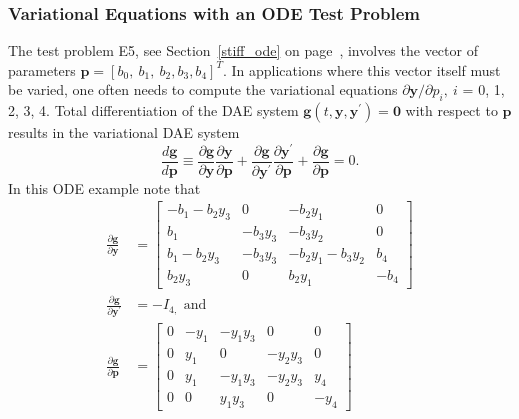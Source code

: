 \documentclass[twoside]{MATH77}
\begin{document}
\subsubsection{Variational Equations with an ODE Test Problem}
The test problem E5, see Section~\ref{stiff_ode} on page~\pageref{stiff_ode},
involves the vector of parameters $\mathbf{p}=[b_{0},\ b_{1},\ b_{2}, b_{3},
b_{4}]^T$.  In applications where this vector itself must be varied, one often
needs to compute the variational equations $\partial \mathbf{y}/\partial
p_{i},\ i$ = 0, 1, 2, 3, 4. Total differentiation of the DAE system
$\mathbf{g}(t,\mathbf{y}, \mathbf{y}^{\prime}) =\mathbf{0}$ with respect to
$\mathbf{p}$ results in the variational DAE system
\begin{equation*}
  \frac{d \mathbf{g}}{d\mathbf{p}}\equiv\frac{\partial \mathbf{g}}{\partial
    \mathbf{y}}\frac{\partial \mathbf{y}}{\partial \mathbf{p}}
  +\frac{\partial \mathbf{g}}{\partial
    \mathbf{y}^{\prime}}\frac{\partial \mathbf{y}^{\prime}}{\partial \mathbf{p}}
  +\frac{\partial \mathbf{g}}{\partial \mathbf{p}}=0.
\end{equation*}
In this ODE example note that
\begin{align*}
  \frac{\partial \mathbf{g}}{\partial \mathbf{y}}&=
  \begin{bmatrix}
    -b_{1}-b_{2}y_{3} & 0 & -b_{2}y_{1} & 0\\
    b_{1} & -b_{3}y_{3} & -b_{3}y_{2} & 0\\
    b_{1}-b_{2}y_{3} & -b_{3}y_{3} & -b_{2}y_{1}-b_{3}y_{2} & b_{4}\\
    b_{2}y_{3} & 0 & b_{2}y_{1} & -b_{4}
  \end{bmatrix}\\
  \frac{\partial \mathbf{g}}{\partial \mathbf{y}^{\prime}}&=-I_{4,}\text{ and}\\
  \frac{\partial \mathbf{g}}{\partial \mathbf{p}}&=
  \begin{bmatrix}
    0 & -y_{1} & -y_{1}y_{3} & 0 & 0\\
    0 & y_{1} & 0 & -y_{2}y_{3} & 0\\
    0 & y_{1} & -y_{1}y_{3} & -y_{2}y_{3} & y_{4}\\
    0 & 0 & y_{1}y_{3} & 0 & -y_{4}
  \end{bmatrix}
\end{align*}
\end{document}
